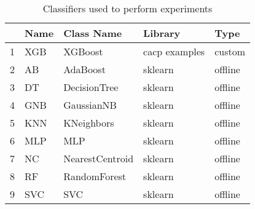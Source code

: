 \begin{table}
\footnotesize
\caption{Classifiers used to perform experiments}
\label{tab:algorithm}
\begin{tabular}{lllll}
\hline
 & Name & Class Name & Library & Type \\
\hline
1 & XGB & XGBoost & cacp examples & custom \\
2 & AB & AdaBoost & sklearn & offline \\
3 & DT & DecisionTree & sklearn & offline \\
4 & GNB & GaussianNB & sklearn & offline \\
5 & KNN & KNeighbors & sklearn & offline \\
6 & MLP & MLP & sklearn & offline \\
7 & NC & NearestCentroid & sklearn & offline \\
8 & RF & RandomForest & sklearn & offline \\
9 & SVC & SVC & sklearn & offline \\
\hline
\end{tabular}
\end{table}
